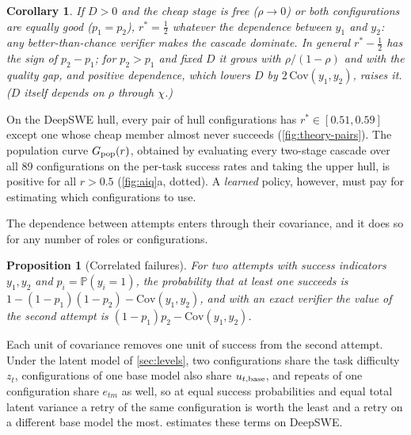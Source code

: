 \documentclass[11pt,a4paper]{article}
\newtheorem{proposition}{Proposition}
\newtheorem{corollary}{Corollary}
\theoremstyle{definition}
\theoremstyle{remark}
\theoremstyle{definition}
\renewcommand{\Pr}{\mathbb{P}}
\begin{document}
\begin{corollary}
\label{cor:half}
If $D>0$ and the cheap stage is free ($\rho\to0$) or both configurations are equally good ($p_1=p_2$), $r^\ast=\tfrac12$ whatever the dependence between $y_1$ and $y_2$: any better-than-chance verifier makes the cascade dominate. In general $r^\ast-\tfrac12$ has the sign of $p_2-p_1$; for $p_2>p_1$ and fixed $D$ it grows with $\rho/(1-\rho)$ and with the quality gap, and positive dependence, which lowers $D$ by $2\,\mathrm{Cov}(y_1,y_2)$, raises it. ($D$ itself depends on $\rho$ through $\chi$.)
\end{corollary}

On the DeepSWE hull, every pair of hull configurations has $r^\ast\in[0.51,0.59]$ except one whose cheap member almost never succeeds (\cref{fig:theory-pairs}). The population curve $G_{\rm pop}(r)$, obtained by evaluating every two-stage cascade over all 89 configurations on the per-task success rates and taking the upper hull, is positive for all $r>0.5$ (\cref{fig:aiq}a, dotted). A \emph{learned} policy, however, must pay for estimating which configurations to use.

The dependence between attempts enters through their covariance, and it does so for any number of roles or configurations.

\begin{proposition}[Correlated failures]
\label{prop:retry}
For two attempts with success indicators $y_1,y_2$ and $p_i=\Pr(y_i=1)$, the probability that at least one succeeds is $1-(1-p_1)(1-p_2)-\mathrm{Cov}(y_1,y_2)$, and with an exact verifier the value of the second attempt is $(1-p_1)p_2-\mathrm{Cov}(y_1,y_2)$.
\end{proposition}
Each unit of covariance removes one unit of success from the second attempt. Under the latent model of \cref{sec:levels}, two configurations share the task difficulty $z_t$, configurations of one base model also share $u_{t,{\rm base}}$, and repeats of one configuration share $e_{tm}$ as well, so at equal success probabilities and equal total latent variance a retry of the same configuration is worth the least and a retry on a different base model the most.  estimates these terms on DeepSWE.
\end{document}
